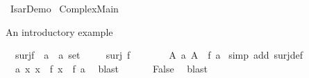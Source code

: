 %
\begin{isabellebody}%
%
%
\isadelimtheory
%
\endisadelimtheory
%
\isatagtheory
{}\isamarkupfalse%
\ Isar{\isacharunderscore}{\kern0pt}Demo\isanewline
{}\ Complex{\isacharunderscore}{\kern0pt}Main\isanewline
{}%
\endisatagtheory
{\isafoldtheory}%
%
\isadelimtheory
%
\endisadelimtheory
%
\isadelimdocument
%
\endisadelimdocument
%
\isatagdocument
%
\isamarkuptrue%
%
\endisatagdocument
{\isafolddocument}%
%
\isadelimdocument
%
\endisadelimdocument
%
\begin{isamarkuptext}%
An introductory example%
\end{isamarkuptext}\isamarkuptrue%
\isamarkupfalse%
\ {\isachardoublequoteopen}{\isasymnot}\ surj{\isacharparenleft}{\kern0pt}f\ {\isacharcolon}{\kern0pt}{\isacharcolon}{\kern0pt}\ {\isacharprime}{\kern0pt}a\ {\isasymRightarrow}\ {\isacharprime}{\kern0pt}a\ set{\isacharparenright}{\kern0pt}{\isachardoublequoteclose}\isanewline
%
\isadelimproof
%
\endisadelimproof
%
\isatagproof
{}\isamarkupfalse%
\isanewline
\ \ \isamarkupfalse%
\ {}{\isacharcolon}{\kern0pt}\ {\isachardoublequoteopen}surj\ f{\isachardoublequoteclose}\isanewline
\ \ \isamarkupfalse%
\ {}\ \isamarkupfalse%
\ {}{\isacharcolon}{\kern0pt}\ {\isachardoublequoteopen}{\isasymforall}A{\isachardot}{\kern0pt}\ {\isasymexists}a{\isachardot}{\kern0pt}\ A\ {\isacharequal}{\kern0pt}\ f\ a{\isachardoublequoteclose}\ \isamarkupfalse%
{\isacharparenleft}{\kern0pt}simp\ add{\isacharcolon}{\kern0pt}\ surj{\isacharunderscore}{\kern0pt}def{\isacharparenright}{\kern0pt}\isanewline
\ \ \isamarkupfalse%
\ {}\ \isamarkupfalse%
\ {}{\isacharcolon}{\kern0pt}\ {\isachardoublequoteopen}{\isasymexists}a{\isachardot}{\kern0pt}\ {\isacharbraceleft}{\kern0pt}x{\isachardot}{\kern0pt}\ x\ {\isasymnotin}\ f\ x{\isacharbraceright}{\kern0pt}\ {\isacharequal}{\kern0pt}\ f\ a{\isachardoublequoteclose}\ \isamarkupfalse%
\ blast\isanewline
\ \ \isamarkupfalse%
\ {}\ \isamarkupfalse%
\ {\isachardoublequoteopen}False{\isachardoublequoteclose}\ \isamarkupfalse%
\ blast\isanewline
{}\isamarkupfalse%
%
\endisatagproof
{\isafoldproof}%
%
\isadelimproof
%
\endisadelimproof
%
\begin{isamarkuptext}%

\end{isamarkuptext}
\end{isabellebody}
